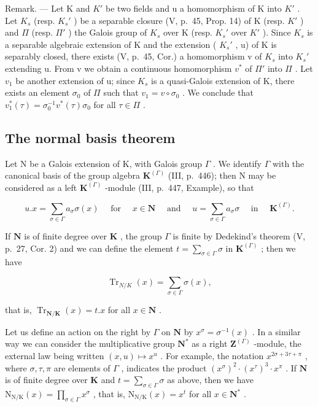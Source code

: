 Remark. --- Let K and \(K'\) be two fields and u a homomorphism of K into \(K'\) . Let \(K_s\) (resp. \(K_s'\) ) be a separable closure (V, p.~45, Prop. 14) of K (resp. \(K'\) ) and \(\Pi\) (resp. \(\Pi'\) ) the Galois group of \(K_s\) over K (resp. \(K_s'\) over \(K'\) ). Since \(K_s\) is a separable algebraic extension of K and the extension ( \(K_s'\) , u) of K is separably closed, there exists (V, p.~45, Cor.) a homomorphism v of \(K_s\) into \(K_s'\) extending u. From v we obtain a continuous homomorphism \(v^*\) of \(\Pi'\) into \(\Pi\) . Let \(v_1\) be another extension of u; since \(K_s\) is a quasi-Galois extension of K, there exists an element \(\sigma_0\) of \(\Pi\) such that \(v_1 = v \circ \sigma_0\) . We conclude that \(v_1^*(\tau) = \sigma_0^{-1} v^*(\tau) \sigma_0\) for all \(\tau \in \Pi\) .

\subsection{The normal basis theorem}

Let N be a Galois extension of K, with Galois group \(\Gamma\) . We identify \(\Gamma\) with the canonical basis of the group algebra \(\mathbf{K}^{(\Gamma)}\) (III, p.~446); then N may be considered as a left \(\mathbf{K}^{(\Gamma)}\) -module (III, p.~447, Example), so that

\[
u. x = \sum_ {\sigma \in \Gamma} a _ {\sigma} \sigma (x) \quad \text { for } \quad x \in \mathbf {N} \quad \text { and } \quad u = \sum_ {\sigma \in \Gamma} a _ {\sigma} \sigma \quad \text { in } \quad \mathbf {K} ^ {(\Gamma)}.
\]

If \(\mathbf{N}\) is of finite degree over \(\mathbf{K}\) , the group \(\Gamma\) is finite by Dedekind's theorem (V, p.~27, Cor. 2) and we can define the element \(t = \sum_{\sigma \in \Gamma} \sigma\) in \(\mathbf{K}^{(\Gamma)}\) ; then we have

\[
\operatorname{Tr} _ {N / K} (x) = \sum_ {\sigma \in \Gamma} \sigma (x),
\]

that is, \(\operatorname{Tr}_{\mathbf{N} / \mathbf{K}}(x) = t.x\) for all \(x \in \mathbf{N}\) .

Let us define an action on the right by \(\Gamma\) on \(\mathbf{N}\) by \(x^{\sigma} = \sigma^{-1}(x)\) . In a similar way we can consider the multiplicative group \(\mathbf{N}^{*}\) as a right \(\mathbf{Z}^{(\Gamma)}\) -module, the external law being written \((x, u) \mapsto x^u\) . For example, the notation \(x^{2\sigma + 3\tau + \pi}\) , where \(\sigma, \tau, \pi\) are elements of \(\Gamma\) , indicates the product \((x^\sigma)^2 \cdot (x^\tau)^3 \cdot x^\pi\) . If \(\mathbf{N}\) is of finite degree over \(\mathbf{K}\) and \(t = \sum_{\sigma \in \Gamma} \sigma\) as above, then we have \(\mathrm{N}_{\mathrm{N/K}}(x) = \prod_{\sigma \in \Gamma} x^\sigma\) , that is, \(\mathrm{N}_{\mathrm{N/K}}(x) = x^t\) for all \(x \in \mathbf{N}^*\) .

